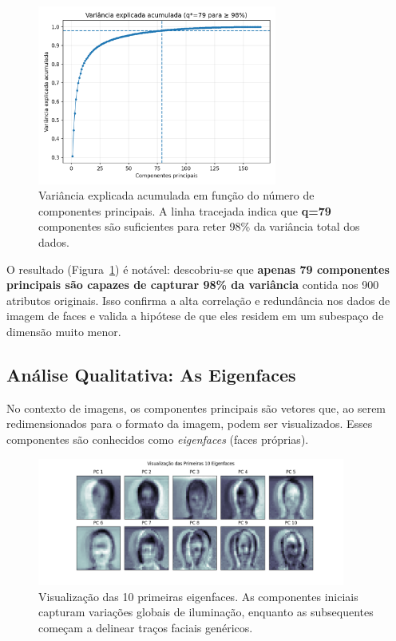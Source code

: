 \documentclass[a4paper,12pt]{article}
\begin{document}
\begin{figure}[h!]
  \centering
  \includegraphics[width=0.7\textwidth]{../results/TC2/pca_variance_explained_A3.png}
  \caption{Variância explicada acumulada em função do número de componentes principais. A linha tracejada indica que \textbf{q=79} componentes são suficientes para reter 98\% da variância total dos dados.}
  \label{fig:var_explicada}
\end{figure}

O resultado (Figura~\ref{fig:var_explicada}) é notável: descobriu-se que \textbf{apenas 79 componentes principais são capazes de capturar 98\% da variância} contida nos 900 atributos originais. Isso confirma a alta correlação e redundância nos dados de imagem de faces e valida a hipótese de que eles residem em um subespaço de dimensão muito menor.

\subsection{Análise Qualitativa: As Eigenfaces}

No contexto de imagens, os componentes principais são vetores que, ao serem redimensionados para o formato da imagem, podem ser visualizados. Esses componentes são conhecidos como \emph{eigenfaces} (faces próprias).

\begin{figure}[h!]
  \centering
  \includegraphics[width=0.9\textwidth]{../results/TC2/eigenfaces_visualization.png}
  \caption{Visualização das 10 primeiras eigenfaces. As componentes iniciais capturam variações globais de iluminação, enquanto as subsequentes começam a delinear traços faciais genéricos.}
  \label{fig:eigenfaces}
\end{figure}
\end{document}
